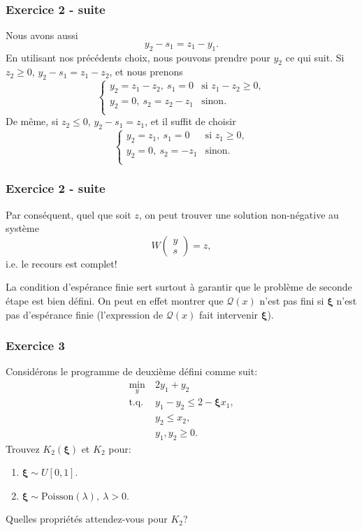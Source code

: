 \documentclass{beamer}
\def\bxi{\boldsymbol\xi}
\begin{document}
\begin{frame}
\frametitle{Exercice 2 - suite}

Nous avons aussi
\[
y_2 - s_1 = z_1 - y_1.
\]
En utilisant nos précédents choix, nous pouvons prendre pour $y_2$ ce
qui suit. Si $z_2 \geq 0$, $y_2 - s_1 = z_1 - z_2$, et nous prenons
\[
\begin{cases}
y_2 = z_1-z_2,\ s_1 = 0 & \mbox{si } z_1-z_2 \geq 0,\\
y_2 = 0,\ s_2 = z_2-z_1 & \mbox{sinon}.\\
\end{cases}
\]
De même, si $z_2 \leq 0$, $y_2 - s_1 = z_1$, et il suffit de choisir
\[
\begin{cases}
y_2 = z_1,\ s_1 = 0 & \mbox{si } z_1 \geq 0,\\
y_2 = 0,\ s_2 = -z_1 & \mbox{sinon}.\\
\end{cases}
\]

\end{frame}

\begin{frame}
\frametitle{Exercice 2 - suite}

Par conséquent, quel que soit $z$, on peut trouver une solution
non-négative au système
\[
W\begin{pmatrix} y \\ s \end{pmatrix} = z,
\]
i.e. le recours est complet!




La condition d'espérance finie sert surtout à garantir que le problème
de seconde étape est bien défini.
On peut en effet montrer que $\mathcal{Q}(x)$ n'est pas fini si
$\bxi$ n'est pas d'espérance finie (l'expression de $\mathcal{Q}(x)$
fait intervenir $\bxi$).

\end{frame}

\begin{frame}
\frametitle{Exercice 3}

Considérons le programme de deuxième défini comme suit:
\begin{align*}
\min_y\ & 2y_1+y_2\\
\mbox{t.q. } & y_1 - y_2 \leq 2-\bxi x_1,\\
& y_2 \leq x_2,\\
& y_1, y_2 \geq 0.
\end{align*}
Trouvez $K_2(\bxi)$ et $K_2$ pour:
\begin{enumerate}
\item
$\bxi \sim U[0,1]$.
\item
$\bxi \sim \mbox{Poisson}(\lambda),\ \lambda > 0$.
\end{enumerate}
Quelles propriétés attendez-vous pour $K_2$?

\end{frame}
\end{document}
